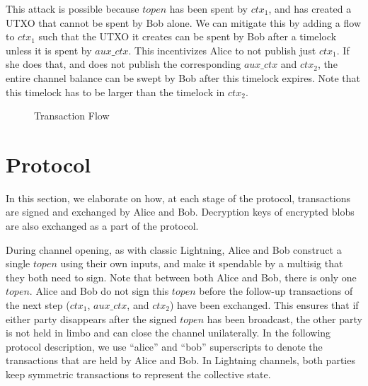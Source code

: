 This attack is possible because $topen$ has been spent by $\mathit{ctx_1}$, and has created a UTXO that cannot be spent by Bob alone. We can mitigate this by adding a flow to $\mathit{ctx_1}$ such that the UTXO it creates can be spent by Bob after a timelock unless it is spent by $\mathit{aux\_ctx}$. This incentivizes Alice to not publish just $\mathit{ctx_1}$. If she does that, and does not publish the corresponding $\mathit{aux\_ctx}$ and $\mathit{ctx_2}$, the entire channel balance can be swept by Bob after this timelock expires. Note that this timelock has to be larger than the timelock in $\mathit{ctx_2}$. 

\begin{figure}[H]
\begin{centering}
\caption{Transaction Flow}
\label{transaction_flow}
\end{centering} 
\end{figure}

\section{Protocol} \label{protocol}
In this section, we elaborate on how, at each stage of the protocol, transactions are signed and exchanged by Alice and Bob. Decryption keys of encrypted blobs are also exchanged as a part of the protocol.

During channel opening, as with classic Lightning, Alice and Bob construct a single $\mathit{topen}$ using their own inputs, and make it spendable by a multisig that they both need to sign. Note that between both Alice and Bob, there is only one $\mathit{topen}$. Alice and Bob do not sign this $\mathit{topen}$ before the follow-up transactions of the next step ($\mathit{ctx_1}$, $\mathit{aux\_ctx}$, and $\mathit{ctx_2}$) have been exchanged. This ensures that if either party disappears after the signed $\mathit{topen}$ has been broadcast, the other party is not held in limbo and can close the channel unilaterally. In the following protocol description, we use ``alice'' and ``bob'' superscripts to denote the transactions that are held by Alice and Bob. In Lightning channels, both parties keep symmetric transactions to represent the collective state. 

